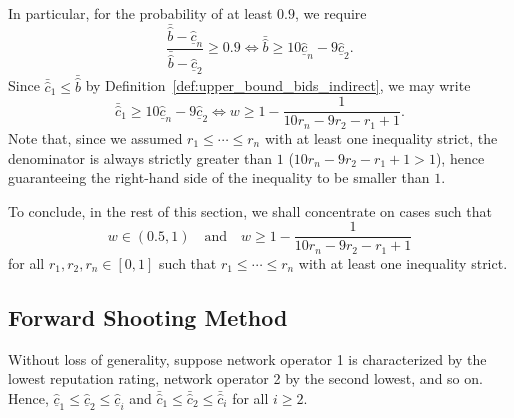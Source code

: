 In particular, for the probability of at least $0.9$, we require
\begin{equation*}
  \frac{\bar{\hat{b}} - \underline{\hat{c}}_n}{\bar{\hat{b}} - \underline{\hat{c}}_2} \geq 0.9 \iff \bar{\hat{b}}\geq 10\underline{\hat{c}}_n - 9\underline{\hat{c}}_2.
\end{equation*}
Since $\bar{\hat{c}}_1\leq \bar{\hat{b}}$ by Definition~\ref{def:upper_bound_bids_indirect}, we may write
\begin{equation*}
  \bar{\hat{c}}_1 \geq 10\underline{\hat{c}}_n - 9\underline{\hat{c}}_2 \iff w \geq 1 - \frac{1}{10r_n - 9r_2 - r_1 + 1}.
\end{equation*}
Note that, since we assumed $r_1\leq\cdots\leq r_n$ with at least one inequality strict, the denominator is always strictly greater than $1$ ($10r_n - 9r_2-r_1+1 > 1$), hence guaranteeing the right-hand side of the inequality to be smaller than $1$.

To conclude, in the rest of this section, we shall concentrate on cases such that
\begin{equation*}
  w \in (0.5, 1) \quad\text{and}\quad w \geq 1 - \frac{1}{10r_n - 9r_2 - r_1 + 1}
\end{equation*}
for all $r_1,r_2,r_n\in [0,1]$ such that $r_1\leq\cdots\leq r_n$ with at least one inequality strict.

\subsection{Forward Shooting Method} %
\label{sub:forward_shooting_method_indirect}
Without loss of generality, suppose network operator 1 is characterized by the lowest reputation rating, network operator 2 by the second lowest, and so on. Hence, $\underline{\hat{c}}_1\leq \underline{\hat{c}}_2\leq \underline{\hat{c}}_i$ and $\bar{\hat{c}}_1\leq \bar{\hat{c}}_2\leq \bar{\hat{c}}_i$ for all $i\geq 2$.

